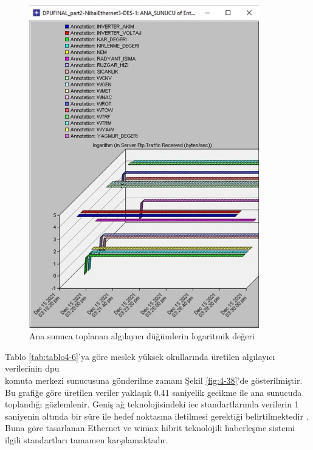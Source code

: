 \begin{figure}[htbp]
\centerline{\includegraphics[width=10cm]{Resim/sekil4-36.jpg}}
\caption{Ana sunuca toplanan algılayıcı düğümlerin logaritmik değeri}
\label{fig:4-37}
\end{figure}

Tablo \ref{tab:tablo4-6}’ya göre meslek yüksek okullarında üretilen algılayıcı verilerinin \gls{dpu} \\komuta merkezi sunucusuna gönderilme zamanı Şekil \ref{fig:4-38}’de gösterilmiştir. Bu grafiğe göre üretilen veriler yaklaşık 0.41 saniyelik gecikme ile ana sunucuda toplandığı gözlemlenir. Geniş ağ teknolojisindeki \gls{iec} standartlarında verilerin 1 saniyenin altında bir süre ile hedef noktasına iletilmesi gerektiği belirtilmektedir \cite{mackiewicz2006overview}. Buna göre tasarlanan Ethernet ve \gls{wimax} hibrit teknolojili haberleşme sistemi ilgili standartları tamamen karşılamaktadır.


